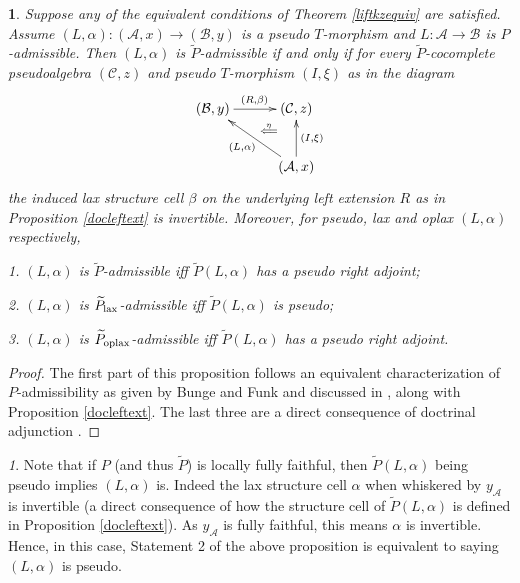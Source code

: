\documentclass[a4paper,oneside,english]{amsart}
\numberwithin{equation}{section}
\numberwithin{figure}{section}
\theoremstyle{plain}
\theoremstyle{definition}
\theoremstyle{remark}
\newtheorem{rem}[thm]{\protect\remarkname}
\theoremstyle{definition}
\theoremstyle{plain}
\newtheorem{prop}[thm]{\protect\propositionname}
\theoremstyle{plain}
\theoremstyle{plain}
\providecommand{\propositionname}{Proposition}
\providecommand{\remarkname}{Remark}
\begin{document}
\begin{prop}
Suppose any of the equivalent conditions of Theorem \ref{liftkzequiv}
are satisfied. Assume $\left(L,\alpha\right)\colon\left(\mathcal{A},x\right)\to\left(\mathcal{B},y\right)$
is a pseudo $T$-morphism and $L\colon\mathcal{A}\to\mathcal{B}$
is $P$-admissible. Then $\left(L,\alpha\right)$ is $\widetilde{P}$-admissible
if and only if for every $\widetilde{P}$-cocomplete pseudoalgebra
$\left(\mathcal{C},z\right)$ and pseudo $T$-morphism $\left(I,\xi\right)$
as in the diagram
\[
\xymatrix@=1em{\left(\mathcal{B},y\right)\ar[rr]^{\left(R,\beta\right)} &  & \left(\mathcal{C},z\right)\ar@{}[dl]|-{\stackrel{\eta}{\Longleftarrow}}\\
 & \;\\
 &  & \left(\mathcal{A},x\right)\ar[uu]_{\left(I,\xi\right)}\ar[uull]^{\left(L,\alpha\right)}
}
\]
the induced lax structure cell $\beta$ on the underlying left extension
$R$ as in Proposition \ref{docleftext} is invertible. Moreover,
for pseudo, lax and oplax $\left(L,\alpha\right)$ respectively,

1. $\left(L,\alpha\right)$ is $\widetilde{P}$-admissible iff $\widetilde{P}\left(L,\alpha\right)$
has a pseudo right adjoint;

2. $\left(L,\alpha\right)$ is $\widetilde{P}_{\textnormal{lax}}$-admissible
iff $\widetilde{P}\left(L,\alpha\right)$ is pseudo;

3. $\left(L,\alpha\right)$ is $\widetilde{P}_{\textnormal{oplax}}$-admissible
iff $\widetilde{P}\left(L,\alpha\right)$ has a pseudo right adjoint.\end{prop}
\begin{proof}
The first part of this proposition follows an equivalent characterization
of $P$-admissibility as given by Bunge and Funk and discussed in
\cite{bungefunk,yonedakz}, along with Proposition \ref{docleftext}.
The last three are a direct consequence of doctrinal adjunction \cite{doctrinal}.\end{proof}
\begin{rem}
Note that if $P$ (and thus $\widetilde{P}$) is locally fully faithful,
then $\widetilde{P}\left(L,\alpha\right)$ being pseudo implies $\left(L,\alpha\right)$
is. Indeed the lax structure cell $\alpha$ when whiskered by $y_{\mathcal{A}}$
is invertible (a direct consequence of how the structure cell of $\widetilde{P}\left(L,\alpha\right)$
is defined in Proposition \ref{docleftext}). As $y_{\mathcal{A}}$
is fully faithful, this means $\alpha$ is invertible. Hence, in this
case, Statement 2 of the above proposition is equivalent to saying
$\left(L,\alpha\right)$ is pseudo.
\end{rem}
\end{document}
